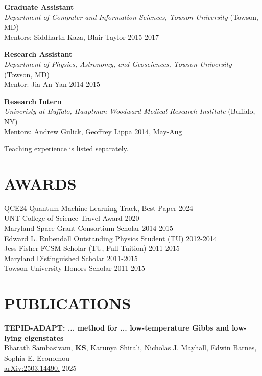 \documentclass[marginmode, 10pt]{res} %
\newcommand{\me}{\textbf{KS}}       %
\begin{document}
\begin{resume}
\textbf{Graduate Assistant} \\
\textit{Department of Computer and Information Sciences, Towson University} (Towson, MD) \\
Mentors: Siddharth Kaza, Blair Taylor \hfill 2015-2017

\textbf{Research Assistant} \\
\textit{Department of Physics, Astronomy, and Geosciences, Towson University} (Towson, MD) \\
Mentor: Jia-An Yan \hfill 2014-2015

\textbf{Research Intern} \\
\textit{Univeristy at Buffalo, Hauptman-Woodward Medical Research Institute} (Buffalo, NY) \\
Mentors: Andrew Gulick, Geoffrey Lippa \hfill 2014, May-Aug

Teaching experience is listed separately.


\section{\small{AWARDS}}

QCE24 Quantum Machine Learning Track, Best Paper \hfill 2024 \\
UNT College of Science Travel Award \hfill 2020 \\
Maryland Space Grant Consortium Scholar \hfill 2014-2015 \\
Edward L. Rubendall Outstanding Physics Student (TU) \hfill 2012-2014 \\
Jess Fisher FCSM Scholar (TU, Full Tuition) \hfill 2011-2015 \\
Maryland Distinguished Scholar \hfill 2011-2015 \\
Towson University Honors Scholar \hfill 2011-2015


\section{\small{PUBLICATIONS}}

\textbf{TEPID-ADAPT: ... method for ... low-temperature Gibbs and low-lying eigenstates} \\
    Bharath Sambasivam, \me, Karunya Shirali, Nicholas J. Mayhall, Edwin Barnes, Sophia E. Economou \\
    \href{https://arxiv.org/abs/2503.14490}{arXiv:2503.14490.} \hfill 2025


\end{resume}
\end{document}
